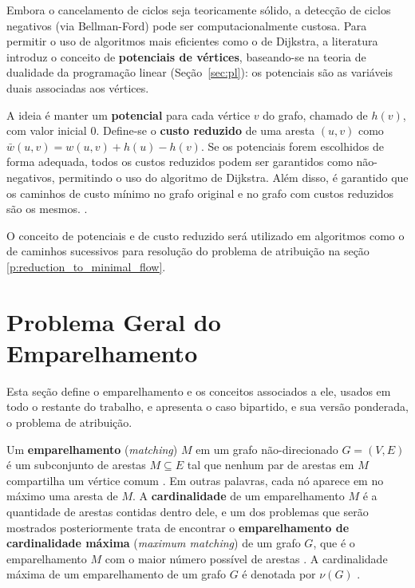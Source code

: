 Embora o cancelamento de ciclos seja teoricamente sólido, a detecção de ciclos negativos (via Bellman-Ford) pode ser computacionalmente custosa. Para permitir o uso de algoritmos mais eficientes como o de Dijkstra, a literatura introduz o conceito de \textbf{potenciais de vértices}, baseando-se na teoria de dualidade da programação linear (Seção~\ref{sec:pl}): os potenciais são as variáveis duais associadas aos vértices.

A ideia é manter um \textbf{potencial} para cada vértice $v$ do grafo, chamado de $h(v)$, com valor inicial 0. Define-se o \textbf{custo reduzido} de uma aresta $(u,v)$ como $\bar{w}(u,v) = w(u,v) + h(u) - h(v)$. Se os potenciais forem escolhidos de forma adequada, todos os custos reduzidos podem ser garantidos como não-negativos, permitindo o uso do algoritmo de Dijkstra. Além disso, é garantido que os caminhos de custo mínimo no grafo original e no grafo com custos reduzidos são os mesmos. \cite{jungnickel}.

O conceito de potenciais e de custo reduzido será utilizado em algoritmos como o de caminhos sucessivos para resolução do problema de atribuição na seção \ref{p:reduction_to_minimal_flow}.

\section{Problema Geral do Emparelhamento}

Esta seção define o emparelhamento e os conceitos associados a ele, usados em todo o restante do trabalho, e apresenta o caso bipartido, e sua versão ponderada, o problema de atribuição.

Um \textbf{emparelhamento} (\textit{matching}) $M$ em um grafo não-direcionado $G=(V,E)$ é um subconjunto de arestas $M \subseteq E$ tal que
nenhum par de arestas em $M$ compartilha um vértice comum \cite{kleinberg}. Em outras palavras, cada nó aparece em no máximo uma aresta de $M$. A \textbf{cardinalidade} de um emparelhamento $M$ é a quantidade de arestas contidas dentro dele, e um dos problemas que serão mostrados posteriormente trata de encontrar o \textbf{emparelhamento de cardinalidade máxima} (\textit{maximum matching}) de um grafo $G$, que é o emparelhamento $M$ com o maior número possível de arestas \cite{cormen}. A cardinalidade máxima de um emparelhamento de um grafo $G$ é denotada por $\nu(G)$ \cite{schrijver}.

